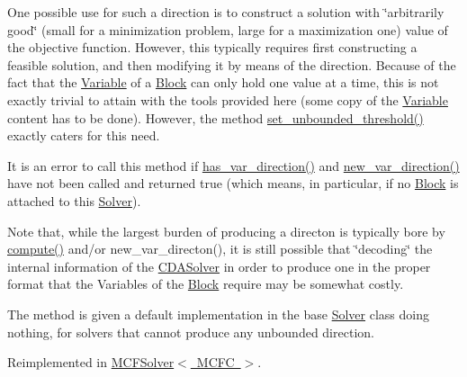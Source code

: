 One possible use for such a direction is to construct a solution with \char`\"{}arbitrarily good\char`\"{} (small for a minimization problem, large for a maximization one) value of the objective function. However, this typically requires first constructing a feasible solution, and then modifying it by means of the direction. Because of the fact that the \mbox{\hyperlink{class_s_m_spp__di__unipi__it_1_1_variable}{Variable}} of a \mbox{\hyperlink{class_s_m_spp__di__unipi__it_1_1_block}{Block}} can only hold one value at a time, this is not exactly trivial to attain with the tools provided here (some copy of the \mbox{\hyperlink{class_s_m_spp__di__unipi__it_1_1_variable}{Variable}} content has to be done). However, the method \mbox{\hyperlink{class_s_m_spp__di__unipi__it_1_1_solver_ae1717d1363782e086aa797e7437c0352}{set\+\_\+unbounded\+\_\+threshold()}} exactly caters for this need.

It is an error to call this method if \mbox{\hyperlink{class_s_m_spp__di__unipi__it_1_1_solver_a27e8c876f577289e523ebf26aeeb977a}{has\+\_\+var\+\_\+direction()}} and \mbox{\hyperlink{class_s_m_spp__di__unipi__it_1_1_solver_a673fc1c81a1fc86e55dfab3a37f303bc}{new\+\_\+var\+\_\+direction()}} have not been called and returned true (which means, in particular, if no \mbox{\hyperlink{class_s_m_spp__di__unipi__it_1_1_block}{Block}} is attached to this \mbox{\hyperlink{class_s_m_spp__di__unipi__it_1_1_solver}{Solver}}).

Note that, while the largest burden of producing a directon is typically bore by \mbox{\hyperlink{class_s_m_spp__di__unipi__it_1_1_solver_a504d4e3e174c7a518cc66156a8a45ce5}{compute()}} and/or new\+\_\+var\+\_\+directon(), it is still possible that \char`\"{}decoding\char`\"{} the internal information of the \mbox{\hyperlink{class_s_m_spp__di__unipi__it_1_1_c_d_a_solver}{C\+D\+A\+Solver}} in order to produce one in the proper format that the Variables of the \mbox{\hyperlink{class_s_m_spp__di__unipi__it_1_1_block}{Block}} require may be somewhat costly.

The method is given a default implementation in the base \mbox{\hyperlink{class_s_m_spp__di__unipi__it_1_1_solver}{Solver}} class doing nothing, for solvers that cannot produce any unbounded direction. 

Reimplemented in \mbox{\hyperlink{class_s_m_spp__di__unipi__it_1_1_m_c_f_solver_af6cbccb8671398cc84c4e0a730a03285}{M\+C\+F\+Solver$<$ M\+C\+F\+C $>$}}.

\mbox{\label{class_s_m_spp__di__unipi__it_1_1_solver_a91d7cd0dc4fa453406ef30db2bfa37a5}} 
